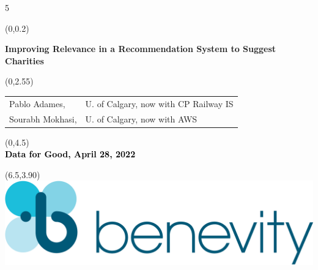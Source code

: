 
    						{5}		%

	\begin{textblock}{19}(0,0.2) %
	\begin{minipage}[c][1.0\TPVertModule]{\textwidth}
	\centering\textcolor{headings}{\large\bfseries Improving Relevance in a Recommendation System to Suggest Charities}
	\end{minipage}
	\end{textblock}


	\begin{textblock}{10}(0,2.55)
	\centering
	\begin{tabular}{ll}
	\textcolor{blue!30!black}{Pablo Adames,} & \hspace{-0.25cm}\textcolor{blue!30!black}{\small U. of Calgary, now with CP Railway IS}\\
	\textcolor{blue!30!black}{ Sourabh Mokhasi,} & \hspace{-0.25cm}\textcolor{blue!30!black}{\small U. of Calgary, now with AWS}
	\end{tabular}
	\end{textblock}

	\begin{textblock}{7}(0,4.5)
	\centering
	\textcolor{black}{\\\bfseries\small Data for Good, April 28, 2022}
	\end{textblock}

	\begin{textblock}{20}(6.5,3.90)
	\centering
        \includegraphics[scale=0.03]{GraphicFiles/benevity1.png}
	\end{textblock}

